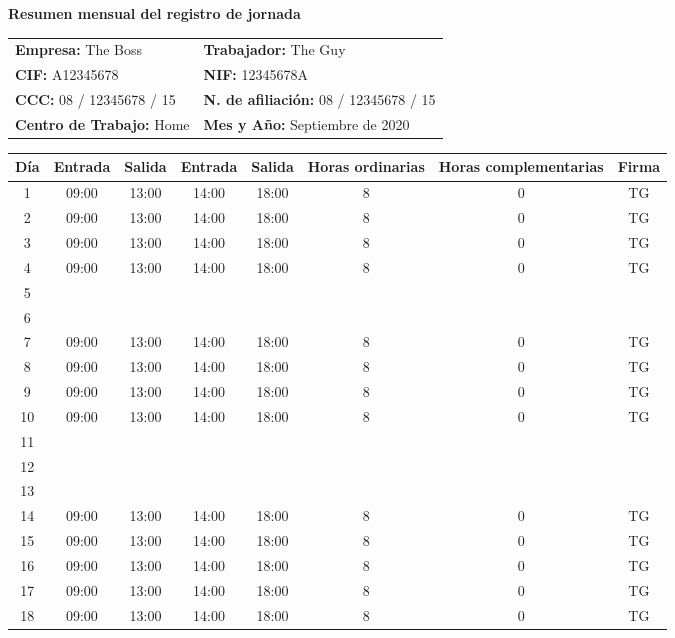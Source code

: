 \documentclass[a4paper, 11pt]{article}
\begin{document}
{\Large \bf Resumen mensual del registro de jornada\\}

\begin{tabular*}{.9\textwidth}{| l @{\extracolsep{\fill}} l |}
    \hline
    {\bf Empresa:} The Boss & {\bf Trabajador:} The Guy \\
    {\bf CIF:} A12345678 & {\bf NIF:} 12345678A \\
    {\bf CCC:} 08 / 12345678 / 15 & {\bf N. de afiliación:} 08 / 12345678 / 15 \\
    {\bf Centro de Trabajo:} Home & {\bf Mes y Año:} Septiembre de 2020 \\
    \hline
\end{tabular*}

\vskip 0.4cm

\begin{tabular}{| c | c | c | c | c | c | c | c |}
  \hline 
  {\bf Día} & {\bf Entrada} & {\bf Salida} & {\bf Entrada} & {\bf Salida} & {\bf Horas ordinarias} &
  {\bf Horas complementarias} & {\bf Firma} \\[1ex]
  \hline
  1 & 09:00 & 13:00 & 14:00 & 18:00 & 8 & 0 & TG \\
  2 & 09:00 & 13:00 & 14:00 & 18:00 & 8 & 0 & TG \\
  3 & 09:00 & 13:00 & 14:00 & 18:00 & 8 & 0 & TG \\
  4 & 09:00 & 13:00 & 14:00 & 18:00 & 8 & 0 & TG \\
  5 & & & & & & & \\
  6 & & & & & & & \\
  7 & 09:00 & 13:00 & 14:00 & 18:00 & 8 & 0 & TG \\
  8 & 09:00 & 13:00 & 14:00 & 18:00 & 8 & 0 & TG \\
  9 & 09:00 & 13:00 & 14:00 & 18:00 & 8 & 0 & TG \\
  10 & 09:00 & 13:00 & 14:00 & 18:00 & 8 & 0 & TG \\
  11 & & & & & & & \\
  12 & & & & & & & \\
  13 & & & & & & & \\
  14 & 09:00 & 13:00 & 14:00 & 18:00 & 8 & 0 & TG \\
  15 & 09:00 & 13:00 & 14:00 & 18:00 & 8 & 0 & TG \\
  16 & 09:00 & 13:00 & 14:00 & 18:00 & 8 & 0 & TG \\
  17 & 09:00 & 13:00 & 14:00 & 18:00 & 8 & 0 & TG \\
  18 & 09:00 & 13:00 & 14:00 & 18:00 & 8 & 0 & TG \\

\end{tabular}
\end{document}

